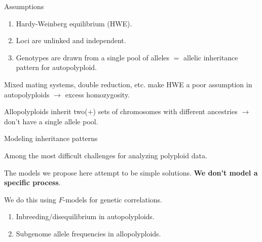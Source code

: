 \documentclass[presentation,sansserif,12pt]{beamer}
\begin{document}
\begin{frame}[t]{Assumptions}

  \begin{enumerate}
    \setlength\itemsep{0.25in}
    \item Hardy-Weinberg equilibrium (HWE).
    \item Loci are unlinked and independent.
    \item Genotypes are drawn from a single pool of alleles $=$ allelic inheritance pattern for autopolyploid.
  \end{enumerate}
  \vspace{0.25in}
  \pause

Mixed mating systems, double reduction, etc. make HWE a poor assumption in autopolyploids \pause $\rightarrow$ excess homozygosity.
\vspace{0.25in}
\pause

Allopolyploids inherit two($+$) sets of chromosomes with different ancestries \pause $\rightarrow$ don't have a single allele pool.

\end{frame}

\begin{frame}[t]{Modeling inheritance patterns}
\vspace{0.2in}
\pause

  Among the most difficult challenges for analyzing polyploid data.
  \vspace{0.3in}
  \pause
  
  The models we propose here attempt to be simple solutions. \textbf{We don't model a specific process}.
  \vspace{0.3in}
  \pause
  
  We do this using $F$-models for genetic correlations.
  \vspace{0.3in}
  \pause
  
  	\begin{enumerate}
		\item Inbreeding/disequilibrium in autopolyploids.
		\item Subgenome allele frequencies in allopolyploids.
	\end{enumerate}

\end{frame}
\end{document}
